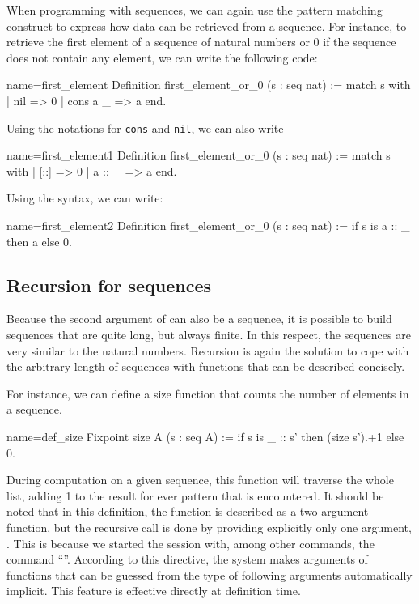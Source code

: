 When programming with sequences, we can again use the  pattern matching
construct to express how data can be retrieved from a sequence.  For
instance, to retrieve the first element of a sequence of natural numbers
or 0 if the sequence does not contain any element, we can write the
following code:

\begin{coq}{name=first_element}{}
Definition first_element_or_0 (s : seq nat) :=
  match s with
  | nil => 0
  | cons a _ => a
  end.
\end{coq}
Using the notations for {\tt cons} and {\tt nil}, we can also write

\begin{coq}{name=first_element1}{}
Definition first_element_or_0 (s : seq nat) :=
  match s with
  | [::] => 0
  | a :: _ => a
  end.
\end{coq}
Using the  syntax, we can write:

\begin{coq}{name=first_element2}{}
Definition first_element_or_0 (s : seq nat) :=
  if s is a :: _ then a else 0.
\end{coq}
\subsection{Recursion for sequences}
Because the second argument of  can also be a sequence, it is
possible to build sequences that are quite long, but always finite.
In this respect, the sequences are very similar to the natural
numbers.  Recursion is again the solution to cope with the arbitrary
length of sequences with functions that can be described concisely.

For instance, we can define a size function that counts the number of
elements in a sequence.

\begin{coq}{name=def_size}{}
Fixpoint size A (s : seq A) :=
  if s is _ :: s' then (size s').+1 else 0.
\end{coq}
During computation on a given sequence, this function will traverse
the whole list, adding 1 to the result for ever
 pattern that is encountered.  It should be noted that in this
definition, the function  is described as a two argument
function, but the recursive call  is done by providing
explicitly only one argument, .  This is because we started the
\Coq{} session with, among other commands, the command ``''.  According to this directive, the \Coq{} system makes
arguments of functions that can be guessed from the type of following
arguments automatically implicit.  This feature is effective directly
at definition time.

